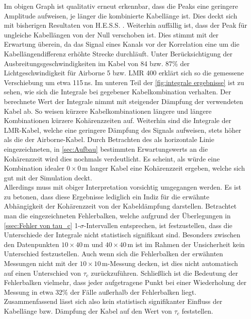 Im obigen Graph ist qualitativ erneut erkennbar, dass die Peaks eine geringere Amplitude aufweisen, je länger die kombinierte Kabellänge ist. 
Dies deckt sich mit bisherigen Resultaten von H.E.S.S. \cite{zmijaFirstIntensityInterferometry2023}. 
Weiterhin auffällig ist, dass der Peak für ungleiche Kabellängen von der Null verschoben ist. 
Dies stimmt mit der Erwartung überein, da das Signal eines Kanals vor der Korrelation eine um die Kabellängendifferenz erhöhte Strecke durchläuft. 
Unter Berücksichtigung der Ausbreitungsgeschwindigkeiten im Kabel von 84 bzw. 87\% der Lichtgeschwindigkeit für Airborne 5 bzw. LMR 400 \cite{s.r.lAirborne10Coaxial,LMR400CoaxCable} erklärt sich so die gemessene Verschiebung um etwa 115\,ns. 
Im unteren Teil der \autoref{fig:integrale ergebnisse} ist zu sehen, wie sich die Integrale bei gegebener Kabelkombination verhalten. 
Der berechnete Wert der Integrale nimmt mit steigender Dämpfung der verwendeten Kabel ab. 
So weisen kürzere Kabelkombinationen längere und längere Kombinationen kürzere Kohärenzzeiten auf. 
Weiterhin sind die Integrale der LMR-Kabel, welche eine geringere Dämpfung des Signals aufweisen, stets höher als die der Airborne-Kabel. 
Durch Betrachten des als horizontale Linie eingezeichneten, in \autoref{sec:Aufbau} bestimmten Erwartungswerts an die Kohärenzzeit wird dies nochmals verdeutlicht. 
Es scheint, als würde eine Kombination idealer $0\times 0\,\mathrm{m}$ langer Kabel eine Kohärenzzeit ergeben, welche sich gut mit der Simulation deckt. \\
Allerdings muss mit obiger Interpretation vorsichtig umgegangen werden. 
Es ist zu betonen, dass diese Ergebnisse lediglich ein Indiz für die erwähnte Abhängigkeit der Kohärenzzeit von der Kabeldämpfung darstellen. 
Betrachtet man die eingezeichneten Fehlerbalken, welche aufgrund der Überlegungen in \autoref{ssec:Fehler von tau_c} 1-$\sigma$-Intervallen entsprechen, ist festzustellen, dass die Unterschiede der Integrale nicht statistisch signifikant sind. 
Besonders zwischen den Datenpunkten $10\times 40\,\mathrm{m}$ und $40\times 40\,\mathrm{m}$ ist im Rahmen der Unsicherheit kein Unterschied festzustellen. 
Auch wenn sich die Fehlerbalken der erwähnten Messungen nicht mit der $10\times 10\,\mathrm{m}$-Messung decken, ist dies nicht automatisch auf einen Unterschied von $\tau_c$ zurückzuführen. 
Schließlich ist die Bedeutung der Fehlerbalken vielmehr, dass jeder aufgetragene Punkt bei einer Wiederholung der Messung in etwa 32\% der Fälle außerhalb der Fehlerbalken liegt. 
Zusammenfassend lässt sich also kein statistisch signifikanter Einfluss der Kabellänge bzw. Dämpfung der Kabel auf den Wert von $\tau_c$ feststellen. 
